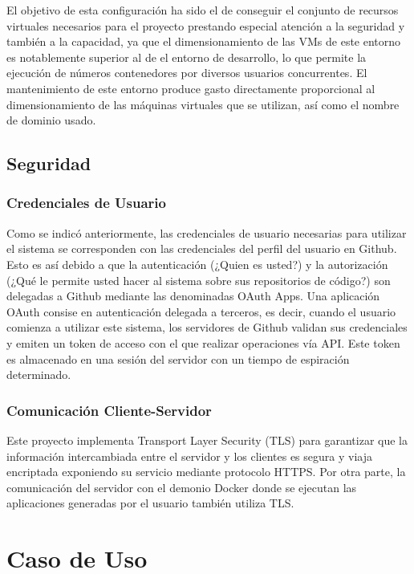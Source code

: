 \documentclass[a4paper,11pt]{book}
\begin{document}
El objetivo de esta configuración ha sido el de conseguir el conjunto de recursos virtuales necesarios para el proyecto prestando especial atención a la seguridad y también a la capacidad, ya que el dimensionamiento de las VMs de este entorno es notablemente superior al de el entorno de desarrollo, lo que permite la ejecución de números contenedores por diversos usuarios concurrentes.  El mantenimiento de este entorno produce gasto directamente proporcional al dimensionamiento de las máquinas virtuales que se utilizan, así como el nombre de dominio usado. 

\subsection{Seguridad}

\subsubsection{Credenciales de Usuario}

Como se indicó anteriormente, las credenciales de usuario necesarias para utilizar el sistema se corresponden con las credenciales del perfil del usuario en Github. Esto es así debido a que la autenticación (¿Quien es usted?) y la autorización (¿Qué le permite usted hacer al sistema sobre sus repositorios de código?) son delegadas a Github mediante las denominadas OAuth Apps. Una aplicación OAuth consise en autenticación delegada a terceros, es decir, cuando el usuario comienza a utilizar este sistema, los servidores de Github validan sus credenciales y emiten un token de acceso con el que realizar operaciones vía API. Este token es almacenado en una sesión del servidor con un tiempo de espiración determinado. 

\subsubsection{Comunicación Cliente-Servidor}

Este proyecto implementa Transport Layer Security (TLS) para garantizar que la información intercambiada entre el servidor y los clientes es segura y viaja encriptada exponiendo su servicio mediante protocolo HTTPS. Por otra parte, la comunicación del servidor con el demonio Docker donde se ejecutan las aplicaciones generadas por el usuario también utiliza TLS.

\section{Caso de Uso}
\end{document}
